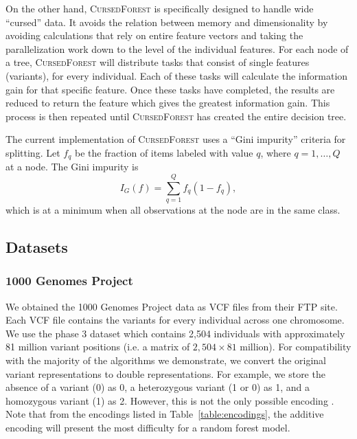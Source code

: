 \documentclass[10pt,letterpaper]{article}
\newcommand{\cursedforest}{\textsc{CursedForest}\xspace}
\begin{document}
On the other hand, \cursedforest is specifically designed to handle wide ``cursed'' data. It avoids the relation between
memory and dimensionality by avoiding calculations that rely on entire feature vectors and taking the parallelization
work down to the level of the individual features.  For each node of a tree, \cursedforest will distribute
tasks that consist of single features (variants), for every individual.  Each of these tasks will calculate the
information gain for that specific feature.  Once these tasks have completed, the results are reduced to return the
feature which gives the greatest information gain.  This process is then repeated until \cursedforest has created the
entire decision tree.

The current implementation of \cursedforest uses a ``Gini impurity'' criteria for splitting. Let $f_q$ be the fraction
of items labeled with value $q$, where $q = 1, \ldots, Q$ at a node. The Gini impurity is
$$
I_G(f) = \sum_{q = 1}^Q f_q ( 1 - f_q ), 
$$
which is at a minimum when all observations at the node are in the same class.

\subsection{Datasets}
\subsubsection{1000 Genomes Project}
We obtained the 1000 Genomes Project data as VCF files from their FTP site.  Each VCF file contains the variants for
every individual across one chromosome.  We use the phase 3 dataset which contains 2,504 individuals with approximately
81 million variant positions (i.e. a matrix of $2,504 \times 81$ million).  For compatibility with the majority of the
algorithms we demonstrate, we convert the original variant representations to double representations.  For example, we
store the absence of a variant (0) as 0, a heterozygous
variant (1 or 0) as 1, and a
homozygous variant (1) as 2.  However, this is not the only possible encoding \cite{Goldstein.et.al.2011}. Note that from
the encodings listed in Table~\ref{table:encodings}, the additive encoding will present the most difficulty for a random
forest model.
\end{document}

